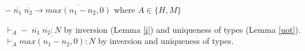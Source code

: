 \begin{case}
$-\;\overline{n_{1}}\;\overline{n_{2}}\rightarrow\overline{max(n_{1}-n_{2},0)}$ where $A\in\lbrace H,M\rbrace$

$\vdash_{A}-\;\overline{n_{1}}\;\overline{n_{2}}:N$ by inversion (Lemma \ref{i}) and uniqueness of types (Lemma \ref{uot}).  $\vdash_{A}\overline{max(n_{1}-n_{2},0)}:N$ by inversion and uniqueness of types.
\end{case}